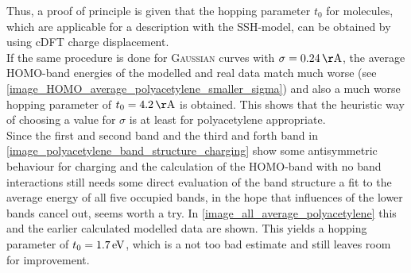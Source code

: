 Thus, a proof of principle is given that the hopping parameter $t_0$ for molecules, which are applicable for a description with the SSH-model, can be obtained by using cDFT charge displacement.\\
\newpage If the same procedure is done for \textsc{Gaussian} curves with $\sigma = \unit[0.24]{\AA}$, the average HOMO-band energies of the modelled and real data match much worse (see \cref{image_HOMO_average_polyacetylene_smaller_sigma}) and also a much worse hopping parameter of $t_0 = \unit[4.2]{\AA}$ is obtained. This shows that the heuristic way of choosing a value for $\sigma$ is at least for polyacetylene appropriate.\\
Since the first and second band and the third and forth band in \cref{image_polyacetylene_band_structure_charging} show some antisymmetric behaviour for charging and the calculation of the HOMO-band with no band interactions still needs some direct evaluation of the band structure a fit to the average energy of all five occupied bands, in the hope that influences of the lower bands cancel out, seems worth a try. In \cref{image_all_average_polyacetylene} this and the earlier calculated modelled data are shown. This yields a hopping parameter of $t_0 = \unit[1.7]{eV}$, which is a not too bad estimate and still leaves room for improvement.
